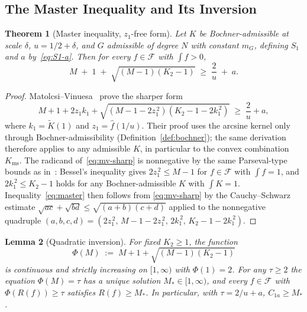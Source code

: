 \documentclass[11pt, letterpaper]{article}
\theoremstyle{plain}
\newtheorem{theorem}{Theorem}[section]
\newtheorem{lemma}[theorem]{Lemma}
\theoremstyle{definition}
\newcommand{\Kms}{K_{\mathrm{ms}}}
\begin{document}
\subsection{The Master Inequality and Its Inversion}\label{subsec:mv-master}

\begin{theorem}[Master inequality, $z_1$-free form]
\label{thm:mv-master}
Let $K$ be Bochner-admissible at scale $\delta$, $u=1/2+\delta$,
and $G$ admissible of degree $N$ with constant $m_G$, defining $S_1$
and $a$ by~\eqref{eq:S1-a}.  Then for every $f\in\mathcal{F}$ with
$\int f>0$,
\begin{equation}\label{eq:master}
  M \;+\; 1 \;+\; \sqrt{(M-1)(K_2-1)}
  \;\ge\;
  \frac{2}{u} \;+\; a.
\end{equation}
\end{theorem}

\begin{proof}
Matolcsi--Vinuesa~\cite[Eq.~(7), Lemma~3.1]{MV10} prove the sharper
form
\begin{equation}\label{eq:mv-sharp}
  M + 1 + 2 z_1 k_1
  + \sqrt{(M-1-2z_1^{\,2})(K_2-1-2k_1^{\,2})}
  \;\ge\;
  \frac{2}{u} + a,
\end{equation}
where $k_1=\widetilde{K}(1)$ and $z_1=\widehat{f}(1/u)$.  Their proof
uses the arcsine kernel only through Bochner-admissibility
(Definition~\ref{def:bochner}); the same derivation therefore applies
to any admissible $K$, in particular to the convex
combination~$\Kms$.  The radicand of~\eqref{eq:mv-sharp} is nonnegative
by the same Parseval-type bounds as in~\cite[\S 3]{MV10}: Bessel's
inequality gives $2z_1^{\,2}\le M-1$ for $f\in\mathcal{F}$ with
$\int f=1$, and $2k_1^{\,2}\le K_2-1$ holds for any Bochner-admissible
$K$ with $\int K=1$.  Inequality~\eqref{eq:master} then follows from
\eqref{eq:mv-sharp} by the Cauchy--Schwarz estimate
$\sqrt{ac}+\sqrt{bd}\le\sqrt{(a+b)(c+d)}$ applied to the nonnegative
quadruple
$(a,b,c,d)=(2z_1^{\,2},\,M-1-2z_1^{\,2},\,2k_1^{\,2},\,K_2-1-2k_1^{\,2})$.
\end{proof}

\begin{lemma}[Quadratic inversion]
\label{lem:inversion}
For fixed $K_2\ge 1$, the function
\[
  \Phi(M)\;:=\;M+1+\sqrt{(M-1)(K_2-1)}
\]
is continuous and strictly increasing on $[1,\infty)$ with
$\Phi(1)=2$.  For any $\tau\ge 2$ the equation $\Phi(M)=\tau$ has a
unique solution $M_*\in[1,\infty)$, and every $f\in\mathcal{F}$ with
$\Phi(R(f))\ge\tau$ satisfies $R(f)\ge M_*$.  In particular, with
$\tau=2/u+a$, $C_{1a}\ge M_*$.
\end{lemma}
\end{document}

